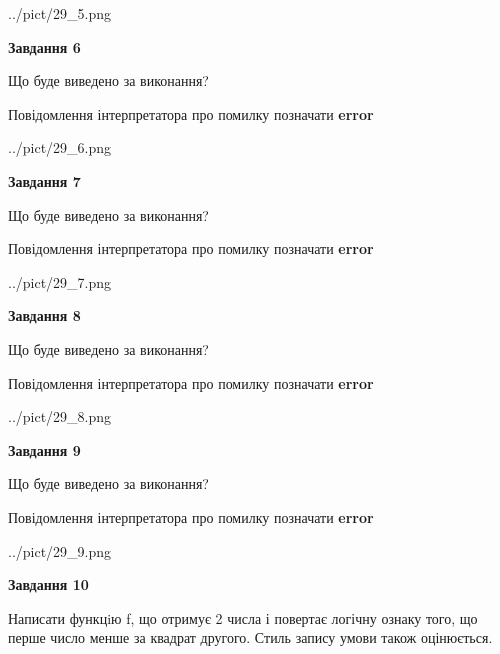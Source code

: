 \documentclass[12pt, ukrainian]{article}
\begin{document}
{\begin {large}
\begin{center}
	{../pict/29_5.png}
\end{center}
\newpage

{\begin {center}\textbf{Завдання 6}\end {center}}\par
Що буде виведено за виконання? \par
Повідомлення інтерпретатора про помилку позначати \textbf{error}

\begin{center}
	{../pict/29_6.png}
\end{center}
\newpage

{\begin {center}\textbf{Завдання 7}\end {center}}\par
Що буде виведено за виконання? \par
Повідомлення інтерпретатора про помилку позначати \textbf{error}

\begin{center}
	{../pict/29_7.png}
\end{center}
\newpage

{\begin {center}\textbf{Завдання 8}\end {center}}\par
Що буде виведено за виконання? \par
Повідомлення інтерпретатора про помилку позначати \textbf{error}

\begin{center}
	{../pict/29_8.png}
\end{center}
\newpage

{\begin {center}\textbf{Завдання 9}\end {center}}\par
Що буде виведено за виконання? \par
Повідомлення інтерпретатора про помилку позначати \textbf{error}

\begin{center}
	{../pict/29_9.png}
\end{center}
\newpage

{\begin {center}\textbf{Завдання 10}\end {center}}\par

Написати функцiю f, що отримує 2 числа і повертає логічну ознаку того, що перше число менше за квадрат другого. Стиль запису умови також оцінюється.\par
\newpage

\end {large}}
\end{document}
